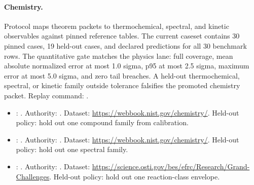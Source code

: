 \paragraph{Chemistry.}
Protocol 
maps theorem packets to thermochemical, spectral, and kinetic observables
against pinned reference tables. The current caseset contains 30 pinned cases,
19 held-out cases, and declared predictions for all 30 benchmark rows. The
quantitative gate matches the physics lane: full coverage, mean absolute
normalized error at most 1.0 sigma, p95 at most 2.5 sigma, maximum error at
most 5.0 sigma, and zero tail breaches. A held-out thermochemical, spectral,
or kinetic family outside tolerance falsifies the promoted chemistry packet.
Replay command:
.
\begin{itemize}[leftmargin=1.5em,nosep]
\item {}: . Authority: . Dataset: \url{https://webbook.nist.gov/chemistry/}. Held-out policy: hold out one compound family from calibration.
\item {}: . Authority: . Dataset: \url{https://webbook.nist.gov/chemistry/}. Held-out policy: hold out one spectral family.
\item {}: . Authority: . Dataset: \url{https://science.osti.gov/bes/efrc/Research/Grand-Challenges}. Held-out policy: hold out one reaction-class envelope.
\end{itemize}

